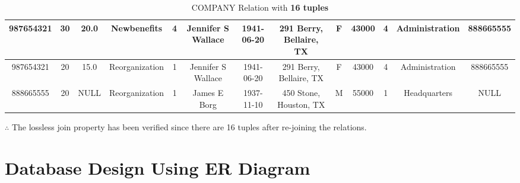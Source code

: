 \documentclass[a4paper,11pt]{article}
\begin{document}
\begin{enumerate}
\begin{table}[H]
\begin{tabular}{|c|c|c|c|c|c|c|c|c|c|c|c|c|}
\hline
987654321 & 30 & 20.0 & Newbenefits & 4 & Jennifer S Wallace & 1941-06-20 & 291 Berry, Bellaire, TX & F & 43000 & 4 & Administration & 888665555\\
\hline
987654321 & 20 & 15.0 & Reorganization & 1 & Jennifer S Wallace & 1941-06-20 & 291 Berry, Bellaire, TX & F & 43000 & 4 & Administration & 888665555\\
\hline
888665555 & 20 & NULL & Reorganization & 1 & James E Borg & 1937-11-10 & 450 Stone, Houston, TX & M & 55000 & 1 & Headquarters & NULL\\
\hline

\end{tabular}

\caption{COMPANY Relation with \textbf{16 tuples}}
\end{table}
\end{enumerate}

$\therefore$ The lossless join property has been verified since there are 16 tuples after re-joining the relations.
\newpage
\section{Database Design Using ER Diagram}
\end{document}
